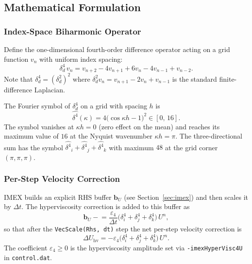 \documentclass[12pt,a4paper]{article}
\newcommand{\dt}{\Delta t}
\begin{document}
	\subsection{Mathematical Formulation}

	\subsubsection{Index-Space Biharmonic Operator}

	Define the one-dimensional fourth-order difference operator acting
	on a grid function $v_n$ with uniform index spacing:
	\begin{equation}
		\delta^4_d\, v_n
		= v_{n+2} - 4v_{n+1} + 6v_n - 4v_{n-1} + v_{n-2}.
		\label{eq:delta4}
	\end{equation}
	Note that $\delta^4_d = (\delta^2_d)^2$ where
	$\delta^2_d v_n = v_{n+1} - 2v_n + v_{n-1}$ is the standard
	finite-difference Laplacian.

	The Fourier symbol of $\delta^4_d$ on a grid with spacing $h$ is
	\begin{equation}
		\widehat{\delta^4}(\kappa)
		= 4\bigl(\cos\kappa h - 1\bigr)^2
		\in [0,\,16].
		\label{eq:symbol}
	\end{equation}
	The symbol vanishes at $\kappa h = 0$ (zero effect on the mean)
	and reaches its maximum value of $16$ at the Nyquist wavenumber
	$\kappa h = \pi$. The three-directional sum has the symbol
	$\widehat{\delta^4}_i + \widehat{\delta^4}_j + \widehat{\delta^4}_k$
	with maximum $48$ at the grid corner $(\pi,\pi,\pi)$.

	\subsubsection{Per-Step Velocity Correction}

	IMEX builds an explicit RHS buffer $\bm{b}_U$ (see Section~\ref{sec:imex})
	and then scales it by $\dt$. The hyperviscosity correction is added to this
	buffer as
	\begin{equation}
		\bm{b}_U \mathrel{-}=
		\frac{\varepsilon_4}{\dt}
		\bigl(\delta^4_i + \delta^4_j + \delta^4_k\bigr)\, U^n,
		\label{eq:bU_hv}
	\end{equation}
	so that after the \texttt{VecScale(Rhs, dt)} step the net
	per-step velocity correction is
	\begin{equation}
		\boxed{
			\Delta U_{\mathrm{hv}}
			= -\varepsilon_4
			\bigl(\delta^4_i + \delta^4_j + \delta^4_k\bigr)\, U^n.
		}
		\label{eq:DU_hv}
	\end{equation}
	The coefficient $\varepsilon_4 \geq 0$ is the hyperviscosity amplitude
	set via \texttt{-imexHyperVisc4U} in \texttt{control.dat}.
\end{document}
